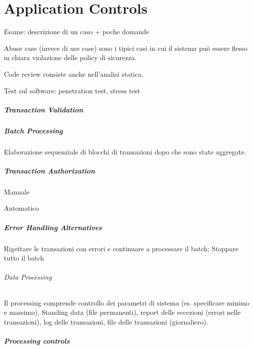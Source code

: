 \chapter{Application Controls}
\label{cs:ac}

Esame: descrizione di un caso + poche domande

Abuse case (invece di use case) sono i tipici casi in cui il sistema può essere
flesso in chiara violazione delle policy di sicurezza.

Code review consiste anche nell'analisi statica.

Test sul software: penetration test, stress test

\paragraph{Transaction Validation}

\paragraph{Batch Processing} Elaborazione sequenziale di blocchi di transazioni
dopo che sono state aggregate. 

\paragraph{Transaction Authorization}
Manuale

Automatico

\paragraph{Error Handling Alternatives}
Rigettare le transazioni con errori e continuare a processare il batch;
Stoppare tutto il batch



\subparagraph{Data Processing}


Il processing comprende controllo dei parametri di sistema (es. specificare
minimo e massimo), Standing data (file permanenti), report delle eccezioni
(errori nelle transazioni), log delle transazioni, file delle transazioni
(giornaliero).

\paragraph{Processing controls}

